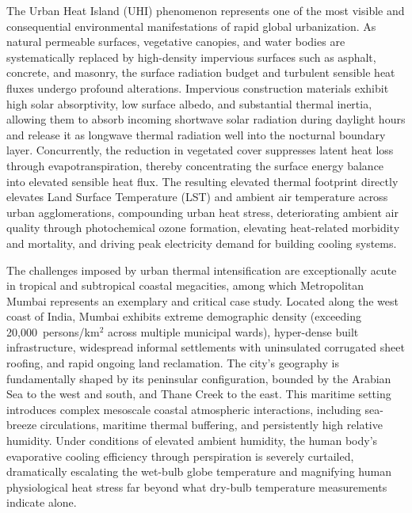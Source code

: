 \documentclass[a4paper,fleqn]{cas-sc}
\begin{document}
The Urban Heat Island (UHI) phenomenon represents one of the most visible and consequential environmental manifestations of rapid global urbanization. As natural permeable surfaces, vegetative canopies, and water bodies are systematically replaced by high-density impervious surfaces such as asphalt, concrete, and masonry, the surface radiation budget and turbulent sensible heat fluxes undergo profound alterations. Impervious construction materials exhibit high solar absorptivity, low surface albedo, and substantial thermal inertia, allowing them to absorb incoming shortwave solar radiation during daylight hours and release it as longwave thermal radiation well into the nocturnal boundary layer. Concurrently, the reduction in vegetated cover suppresses latent heat loss through evapotranspiration, thereby concentrating the surface energy balance into elevated sensible heat flux. The resulting elevated thermal footprint directly elevates Land Surface Temperature (LST) and ambient air temperature across urban agglomerations, compounding urban heat stress, deteriorating ambient air quality through photochemical ozone formation, elevating heat-related morbidity and mortality, and driving peak electricity demand for building cooling systems.

The challenges imposed by urban thermal intensification are exceptionally acute in tropical and subtropical coastal megacities, among which Metropolitan Mumbai represents an exemplary and critical case study. Located along the west coast of India, Mumbai exhibits extreme demographic density (exceeding 20,000~persons/km$^2$ across multiple municipal wards), hyper-dense built infrastructure, widespread informal settlements with uninsulated corrugated sheet roofing, and rapid ongoing land reclamation. The city's geography is fundamentally shaped by its peninsular configuration, bounded by the Arabian Sea to the west and south, and Thane Creek to the east. This maritime setting introduces complex mesoscale coastal atmospheric interactions, including sea-breeze circulations, maritime thermal buffering, and persistently high relative humidity. Under conditions of elevated ambient humidity, the human body's evaporative cooling efficiency through perspiration is severely curtailed, dramatically escalating the wet-bulb globe temperature and magnifying human physiological heat stress far beyond what dry-bulb temperature measurements indicate alone.
\end{document}
